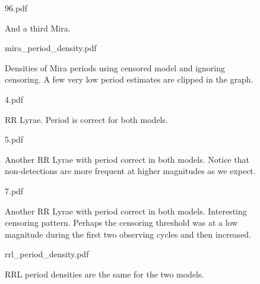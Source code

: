 \documentclass[10pt]{article}
\begin{document}
\begin{figure}[h]
  \begin{center}
    \begin{includegraphics}[height=4in,width=4in]{96.pdf}
      \caption{And a third Mira.}
    \end{includegraphics}
  \end{center}
\end{figure}



\begin{figure}[h]
  \begin{center}
    \begin{includegraphics}[height=4in,width=4in]{mira_period_density.pdf}
      \caption{Densities of Mira periods using censored model and ignoring censoring. A few very low period estimates are clipped in the graph.\label{mira_period_plot}}
    \end{includegraphics}
  \end{center}
\end{figure}



\begin{figure}[h]
  \begin{center}
    \begin{includegraphics}[height=4in,width=4in]{4.pdf}
      \caption{RR Lyrae. Period is correct for both models.}
    \end{includegraphics}
  \end{center}
\end{figure}



\begin{figure}[h]
  \begin{center}
    \begin{includegraphics}[height=4in,width=4in]{5.pdf}
      \caption{Another RR Lyrae with period correct in both models. Notice that non-detections are more frequent at higher magnitudes as we expect.}
    \end{includegraphics}
  \end{center}
\end{figure}




\begin{figure}[h]
  \begin{center}
    \begin{includegraphics}[height=4in,width=4in]{7.pdf}
      \caption{Another RR Lyrae with period correct in both models. Interesting censoring pattern. Perhaps the censoring threshold was at a low magnitude during the first two observing cycles and then increased.}
    \end{includegraphics}
  \end{center}
\end{figure}




\begin{figure}[h]
  \begin{center}
    \begin{includegraphics}[height=4in,width=4in]{rrl_period_density.pdf}
      \caption{RRL period densities are the same for the two models.\label{rrl_period_plot}}
    \end{includegraphics}
  \end{center}
\end{figure}
\end{document}
